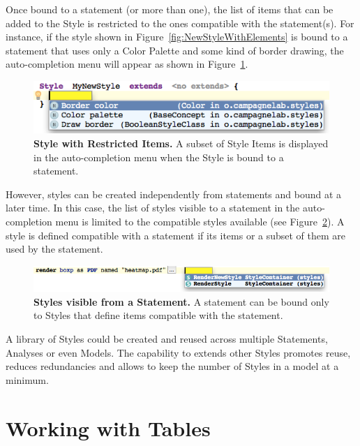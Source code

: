 Once bound to a statement (or more than one), the list of items that can be added to the Style is restricted to the ones compatible with the statement(s). For instance, if the style shown in Figure~\ref{fig:NewStyleWithElements} is bound to a statement that uses only a Color Palette and some kind of border drawing, the auto-completion menu will appear as shown in Figure~\ref{fig:StyleWithRestrictedItems}. 

\begin{figure}[h!tbp]
  \centering
  \includegraphics[width=\figWidthWide]{figures/StyleWithRestrictedItems.png}
\caption[Style with restricted Items.]{\textbf{Style with Restricted Items.}  A subset of Style Items is displayed in the auto-completion menu when the Style is bound to a statement.}
\label{fig:StyleWithRestrictedItems}
\end{figure}

However, styles can be created independently from statements and bound at a later time. In this case, the list of styles visible to a statement in the auto-completion menu is limited to the compatible styles available (see Figure~\ref{fig:VisibleStyles}). A style is defined compatible with a statement if its items or a subset of them are used by the statement.

\begin{figure}[h!tbp]
  \centering
  \includegraphics[width=\figWidthWide]{figures/VisibleStyles.png}
\caption[Styles visible from a Statement.]{\textbf{Styles visible from a Statement.}  A statement can be bound only to Styles that define items compatible with the statement.}
\label{fig:VisibleStyles}
\end{figure}

A library of Styles could be created and reused across multiple Statements, Analyses or even Models. The capability to extends other Styles promotes reuse, reduces redundancies and allows to keep the number of Styles in a model at a minimum.  

\section{Working with Tables}

